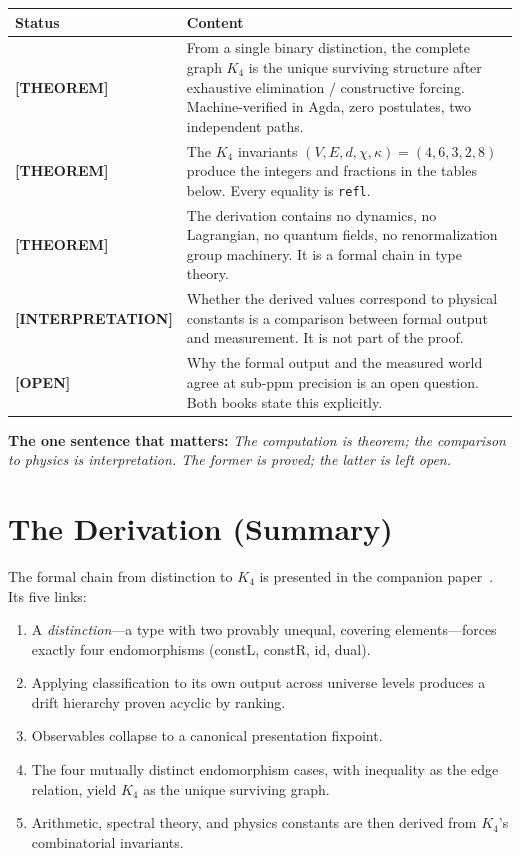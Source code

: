 \documentclass[11pt,a4paper]{article}
\newcommand{\THEOREM}{\textcolor{blue!70!black}{\textbf{[THEOREM]}}}
\newcommand{\INTERP}{\textcolor{orange!80!black}{\textbf{[INTERPRETATION]}}}
\newcommand{\OPEN}{\textcolor{red!70!black}{\textbf{[OPEN]}}}
\theoremstyle{definition}
\begin{document}
\begin{center}
\renewcommand{\arraystretch}{1.4}
\begin{tabular}{@{}lp{9cm}@{}}
\toprule
\textbf{Status} & \textbf{Content} \\
\midrule
\THEOREM & From a single binary distinction, the complete graph $K_4$ is the
  unique surviving structure after exhaustive elimination / constructive
  forcing.  Machine-verified in Agda, zero postulates, two independent paths. \\
\THEOREM & The $K_4$ invariants $(V,E,d,\chi,\kappa) = (4,6,3,2,8)$ produce
  the integers and fractions in the tables below.  Every equality is
  \texttt{refl}. \\
\THEOREM & The derivation contains no dynamics, no Lagrangian, no quantum
  fields, no renormalization group machinery.  It is a formal chain in type
  theory. \\
\INTERP & Whether the derived values correspond to physical constants is a
  comparison between formal output and measurement.  It is not part of the
  proof. \\
\OPEN & Why the formal output and the measured world agree at sub-ppm
  precision is an open question.  Both books state this explicitly. \\
\bottomrule
\end{tabular}
\end{center}

\noindent\textbf{The one sentence that matters:}
\emph{The computation is theorem; the comparison to physics is interpretation.
The former is proved; the latter is left open.}

\section{The Derivation (Summary)}
\label{sec:derivation}

The formal chain from distinction to $K_4$ is presented in the companion
paper~\cite{wielsch2026companion}.  Its five links:

\begin{enumerate}[nosep]
  \item A \emph{distinction}---a type with two provably unequal, covering
    elements---forces exactly four endomorphisms (constL, constR, id, dual).
  \item Applying classification to its own output across universe levels
    produces a drift hierarchy proven acyclic by ranking.
  \item Observables collapse to a canonical presentation fixpoint.
  \item The four mutually distinct endomorphism cases, with inequality as
    the edge relation, yield $K_4$ as the unique surviving graph.
  \item Arithmetic, spectral theory, and physics constants are then
    derived from $K_4$'s combinatorial invariants.
\end{enumerate}
\end{document}

